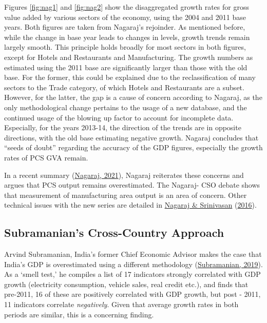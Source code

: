 \documentclass[12pt,nobind, a4paper]{reedthesis}
\begin{document}
 Figures \ref{fig:nag1} and \ref{fig:nag2} show the disaggregated growth rates for gross value added by various sectors of the economy, using the 2004 and 2011 base years. Both figures are taken from Nagaraj's rejoinder. As mentioned before, while the change in base year leads to changes in levels, growth trends remain largely smooth. This principle holds broadly for most sectors in both figures, except for Hotels and Restaurants and Manufacturing. The growth numbers as estimated using the 2011 base are significantly larger than those with the old base. For the former, this could be explained due to the reclassification of many sectors to the Trade category, of which Hotels and Restaurants are a subset. However, for the latter, the gap is a cause of concern according to Nagaraj, as the only methodological change pertains to the usage of a new database, and the continued usage of the blowing up factor to account for incomplete data. Especially, for the years 2013-14, the direction of the trends are in opposite directions, with the old base estimating negative growth. Nagaraj concludes that ``seeds of doubt'' regarding the accuracy of the GDP figures, especially the growth rates of PCS GVA remain.
 \linebreak

 In a recent summary (\protect\hyperlink{ref-nagaraj_revisiting_2021}{Nagaraj, 2021}), Nagaraj reiterates these concerns and argues that PCS output remains overestimated. The Nagaraj- CSO debate shows that measurement of manufacturing area output is an area of concern. Other technical issues with the new series are detailed in \protect\hyperlink{ref-nagaraj_measuring_2016}{Nagaraj \& Srinivasan} (\protect\hyperlink{ref-nagaraj_measuring_2016}{2016}).

 \hypertarget{subramanians-cross-country-approach}{%
 \subsection{Subramanian's Cross-Country Approach}\label{subramanians-cross-country-approach}}

 Arvind Subramanian, India's former Chief Economic Advisor makes the case that India's GDP is overestimated using a different methodology (\protect\hyperlink{ref-subramanian_indias_2019}{Subramanian, 2019}). As a `smell test,' he compiles a list of 17 indicators strongly correlated with GDP growth (electricity consumption, vehicle sales, real credit etc.), and finds that pre-2011, 16 of these are positively correlated with GDP growth, but post - 2011, 11 indicators correlate \emph{negatively}. Given that average growth rates in both periods are similar, this is a concerning finding.
 \linebreak
\end{document}
